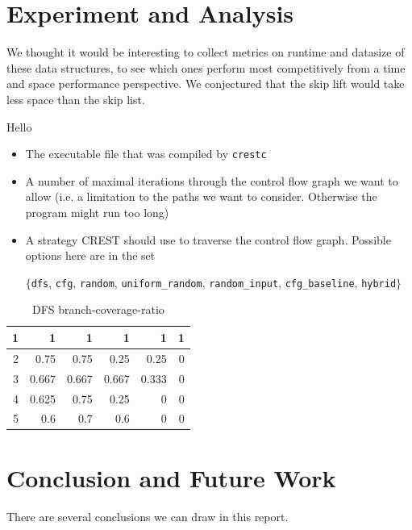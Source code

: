 \documentclass[oribibl]{llncs}
\begin{document}
 \section{Experiment and Analysis}
\label{sctn:experiment}

We thought it would be interesting to collect metrics on runtime and datasize of these data structures, to see which ones perform most competitively from a time and space performance perspective. We conjectured that the skip lift would take less space than the skip list.


\begin{remark}
Hello
\end{remark}

\begin{itemize}
  \item The executable file that was compiled by \texttt{crestc}
  \item A number of maximal iterations through the control flow graph
    we want to allow (i.e. a limitation to the paths we
    want to consider. Otherwise the program might run too long)
  \item A strategy \textsc{CREST} should use to traverse the control
    flow graph. Possible options here are in the set
\begin{center}
$\{$\texttt{dfs}, \texttt{cfg}, \texttt{random},
    \texttt{uniform\_random}, \texttt{random\_input}, 
    \texttt{cfg\_baseline}, \texttt{hybrid}$\}$
\end{center}
\end{itemize}


\begin{table}[htbp]
\caption{DFS branch-coverage-ratio}
\begin{center}
\begin{tabular}{|r|r|r|r|r|r|}
\hline
1 & 1 & 1 & 1 & 1 & 1 \\ \hline
2 & 0.75 & 0.75 & 0.25 & 0.25 & 0 \\ \hline
3 & 0.667 & 0.667 & 0.667 & 0.333 & 0 \\ \hline
4 & 0.625 & 0.75 & 0.25 & 0 & 0 \\ \hline
5 & 0.6 & 0.7 & 0.6 & 0 & 0 \\ \hline
\end{tabular}
\end{center}
\label{DFS timings (in seconds)}
\end{table}

\section{Conclusion and Future Work}
\label{sctn:Conclusion}

There are several conclusions we can draw in this report.




\end{document}
